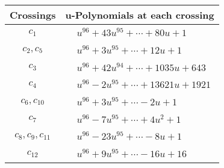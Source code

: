 \documentclass[1p]{elsarticle_modified}
\theoremstyle{definition}
\begin{document}
\begin{tabular}{m{50pt}|m{274pt}}
Crossings & \hspace{64pt}u-Polynomials at each crossing \\
\hline $$\begin{aligned}c_{1}\end{aligned}$$&$\begin{aligned}
&u^{96}+43 u^{95}+\cdots+80 u+1
\end{aligned}$\\
\hline $$\begin{aligned}c_{2},c_{5}\end{aligned}$$&$\begin{aligned}
&u^{96}+3 u^{95}+\cdots+12 u+1
\end{aligned}$\\
\hline $$\begin{aligned}c_{3}\end{aligned}$$&$\begin{aligned}
&u^{96}+42 u^{94}+\cdots+1035 u+643
\end{aligned}$\\
\hline $$\begin{aligned}c_{4}\end{aligned}$$&$\begin{aligned}
&u^{96}-2 u^{95}+\cdots+13621 u+1921
\end{aligned}$\\
\hline $$\begin{aligned}c_{6},c_{10}\end{aligned}$$&$\begin{aligned}
&u^{96}+3 u^{95}+\cdots-2 u+1
\end{aligned}$\\
\hline $$\begin{aligned}c_{7}\end{aligned}$$&$\begin{aligned}
&u^{96}-7 u^{95}+\cdots+4 u^2+1
\end{aligned}$\\
\hline $$\begin{aligned}c_{8},c_{9},c_{11}\end{aligned}$$&$\begin{aligned}
&u^{96}-23 u^{95}+\cdots-8 u+1
\end{aligned}$\\
\hline $$\begin{aligned}c_{12}\end{aligned}$$&$\begin{aligned}
&u^{96}+9 u^{95}+\cdots-16 u+16
\end{aligned}$\\
\hline
\end{tabular}\\~\\
\end{document}

